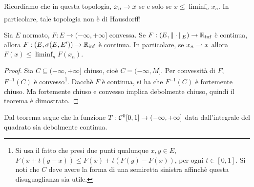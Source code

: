 Ricordiamo che in questa topologia, $x_n \underset{{}}{\rightarrow} x$ se e solo se $x \leq \liminf_n x_n$. In particolare, tale topologia non è di Hausdorff!

\begin{theorem}
\label{th:weaktop_seven}
	Sia $E$ normato, $F : {E \to (-\infty, +\infty]}$ convessa.
	Se ${F : (E, \|\cdot\|_E) \to \mathbb{R}_{\inf}}$ è continua, allora $F : (E, \sigma(E,E')) \to \mathbb{R}_{\inf}$ è continua.
	In particolare, se $x_n \rightharpoonup x$ allora $F(x) \leq \liminf_n F(x_n)$.
\end{theorem}
\begin{proof}
	Sia $C \subseteq (-\infty, + \infty]$ chiuso, cioè $C=(-\infty, M]$. Per convessità di $F$, $F^{-1}(C)$ è convesso\footnote{Si usa il fatto che presi due punti qualunque $x,y \in E$, $F(x+t(y-x)) \leq F(x) + t(F(y) - F(x))$, per ogni $t \in [0,1]$. Si noti che $C$ deve avere la forma di una semiretta sinistra affinchè questa disuguaglianza sia utile.}.
	Dacchè $F$ è continua, si ha che $F^{-1}(C)$ è fortemente chiuso. Ma fortemente chiuso e convesso implica debolmente chiuso, quindi il teorema è dimostrato.
\end{proof}

\begin{remark}
	Dal teorema segue che la funzione $T: \mathcal{C}^0[0,1] \to (-\infty,+\infty]$ data dall'integrale del quadrato sia debolmente continua.
\end{remark}

